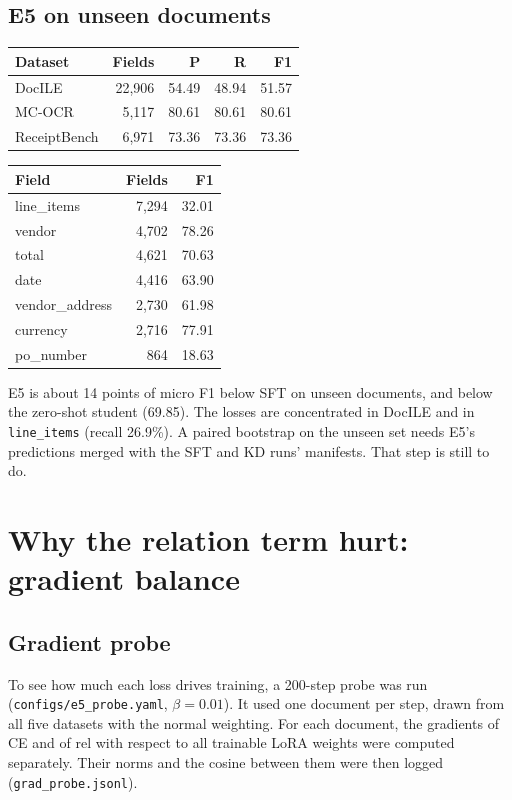\documentclass[10pt]{article}
\newcommand{\code}[1]{\texttt{#1}}
\begin{document}
\subsection*{E5 on unseen documents}

\begin{center}
\begin{tabular}{lrrrr}
\toprule
Dataset & Fields & P & R & F1 \\
\midrule
DocILE & 22{,}906 & 54.49 & 48.94 & 51.57 \\
MC-OCR & 5{,}117 & 80.61 & 80.61 & 80.61 \\
ReceiptBench & 6{,}971 & 73.36 & 73.36 & 73.36 \\
\bottomrule
\end{tabular}
\hspace{1.5em}
\begin{tabular}{lrr}
\toprule
Field & Fields & F1 \\
\midrule
line\_items & 7{,}294 & 32.01 \\
vendor & 4{,}702 & 78.26 \\
total & 4{,}621 & 70.63 \\
date & 4{,}416 & 63.90 \\
vendor\_address & 2{,}730 & 61.98 \\
currency & 2{,}716 & 77.91 \\
po\_number & 864 & 18.63 \\
\bottomrule
\end{tabular}
\end{center}

E5 is about 14 points of micro F1 below SFT on unseen documents, and below the zero-shot student (69.85). The losses are concentrated in DocILE and in \code{line\_items} (recall 26.9\%). A paired bootstrap on the unseen set needs E5's predictions merged with the SFT and KD runs' manifests. That step is still to do.

\section{Why the relation term hurt: gradient balance}

\subsection*{Gradient probe}

To see how much each loss drives training, a 200-step probe was run (\code{configs/e5\_probe.yaml}, $\beta = 0.01$). It used one document per step, drawn from all five datasets with the normal weighting. For each document, the gradients of CE and of rel with respect to all trainable LoRA weights were computed separately. Their norms and the cosine between them were then logged (\code{grad\_probe.jsonl}).
\end{document}
